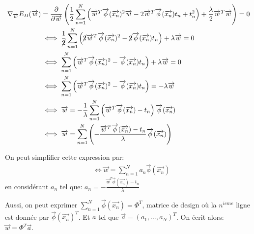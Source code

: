\begin{equation}
\begin{split}
	\nabla_{\overrightarrow{w}} E_D(\overrightarrow{w}) &= \frac{\partial}{\partial \overrightarrow{w}} \left(\frac{1}{2} \sum_{n=1}^N \left(\overrightarrow{w}^T \overrightarrow{\phi}(\overrightarrow{x_n})^2 \overrightarrow{w} - 2 \overrightarrow{w}^T \overrightarrow{\phi}(\overrightarrow{x_n}) t_n + t_n^2\right) + \frac{\lambda}{2} \overrightarrow{w}^T \overrightarrow{w}\right) = 0 \\
	&\iff \frac{1}{\cancel{2}} \sum_{n=1}^N \left( \cancel{2} \overrightarrow{w}^T \overrightarrow{\phi}(\overrightarrow{x_n})^2 - \cancel{2} \overrightarrow{\phi}(\overrightarrow{x_n}) t_n \right) + \lambda \overrightarrow{w} = 0 \\
	&\iff \sum_{n=1}^N \left( \overrightarrow{w}^T \overrightarrow{\phi}(\overrightarrow{x_n})^2 - \overrightarrow{\phi}(\overrightarrow{x_n}) t_n \right) + \lambda \overrightarrow{w} = 0 \\
	&\iff \sum_{n=1}^N \left( \overrightarrow{w}^T \overrightarrow{\phi}(\overrightarrow{x_n})^2 - \overrightarrow{\phi}(\overrightarrow{x_n}) t_n \right) = - \lambda \overrightarrow{w} \\
	&\iff \overrightarrow{w} = - \frac{1}{\lambda}\sum_{n=1}^N \left( \overrightarrow{w}^T \overrightarrow{\phi}(\overrightarrow{x_n}) -  t_n \right)\overrightarrow{\phi}(\overrightarrow{x_n}) \\
	&\iff \overrightarrow{w} = \sum_{n=1}^N \left( - \frac{\overrightarrow{w}^T \overrightarrow{\phi}(\overrightarrow{x_n}) -  t_n }{\lambda}\overrightarrow{\phi}(\overrightarrow{x_n})\right)
\end{split}
\end{equation}

On peut simplifier cette expression par:
\begin{equation}
\begin{split}
	&\iff \overrightarrow{w} = \sum_{n=1}^N a_n \overrightarrow{\phi}(\overrightarrow{x_n})
\end{split}
\end{equation}
en considérant $a_n$ tel que: $ a_n = - \frac{\overrightarrow{w}^T \overrightarrow{\phi}(\overrightarrow{x_n}) -  t_n }{\lambda}$ 

Aussi, on peut exprimer $ \sum_{n=1}^N \overrightarrow{\phi}(\overrightarrow{x_n}) = \Phi^T $, matrice de design où la $ n^{ieme}$ ligne est donnée par $\overrightarrow{\phi}(\overrightarrow{x_n})^T $. Et $a$ tel que $ \overrightarrow{a} = (a_1, ..., a_N)^T$.
On écrit alors: $\overrightarrow{w} = \Phi^T \overrightarrow{a}$.

